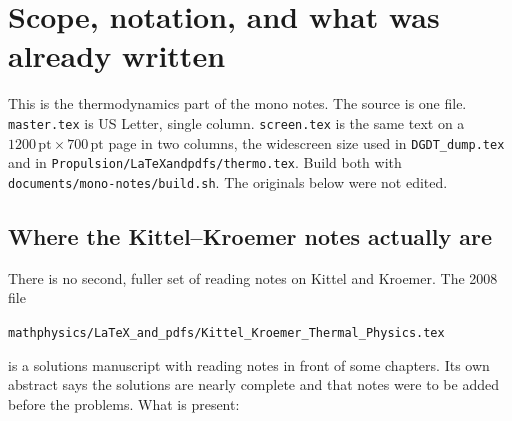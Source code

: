 \section{Scope, notation, and what was already written}
\label{sec:scope}

This is the thermodynamics part of the mono notes. The source is one file. \texttt{master.tex} is US Letter, single column. \texttt{screen.tex} is the same text on a \(1200\,\mathrm{pt}\times 700\,\mathrm{pt}\) page in two columns, the widescreen size used in \texttt{DGDT\_dump.tex} and in \texttt{Propulsion/LaTeXandpdfs/thermo.tex}. Build both with \texttt{documents/mono-notes/build.sh}. The originals below were not edited.

\subsection{Where the Kittel--Kroemer notes actually are}

There is no second, fuller set of reading notes on Kittel and Kroemer. The 2008 file

\begin{center}
\texttt{mathphysics/LaTeX\_and\_pdfs/Kittel\_Kroemer\_Thermal\_Physics.tex}
\end{center}

is a solutions manuscript with reading notes in front of some chapters. Its own abstract says the solutions are nearly complete and that notes were to be added before the problems. What is present:

